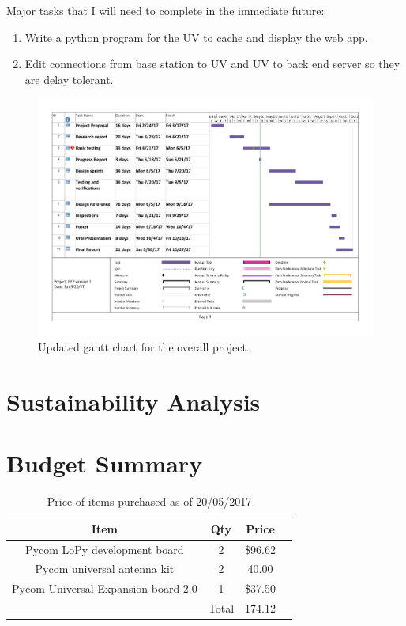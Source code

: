\documentclass[a4paper,12pt]{article}
\begin{document}
\begin{flushleft}
Major tasks that I will need to complete in the immediate future:
\end{flushleft}
\begin{enumerate}
\item Write a python program for the UV to cache and display the web app.
\item Edit connections from base station to UV and UV to back end server so they are delay tolerant. 
\end{enumerate}
\begin{figure}[h!]
\begin{center}
\includegraphics[scale=0.46]{gnattchart2.pdf}
\caption{Updated gantt chart for the overall project.}
\label{figure:gantt}
\end{center}
\end{figure}

\clearpage
\section{Sustainability Analysis}
\clearpage
\section{Budget Summary}

\begin{table}[h!]
\begin{center}
\caption{Price of items purchased as of 20/05/2017}
\begin{tabular}{||c|c|c|c||} 
 \hline
 Item & Qty & Price\\
 \hline
 \hline
 Pycom LoPy development board & 2 & \$96.62 \\
 \hline
 Pycom universal antenna kit & 2 & 40.00\\
 \hline 
 Pycom Universal Expansion board 2.0 & 1 & \$37.50 \\ 
 \hline
  & Total &  174.12\\ 
 \hline
\end{tabular}
\label{table:purchases}
\end{center}
\end{table}
\end{document}
